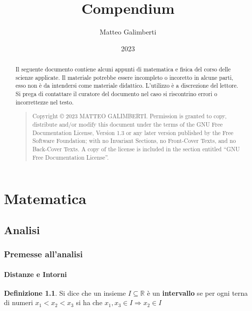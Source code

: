 \documentclass[]{report}
\title{Compendium}
\author{Matteo Galimberti}
\date{2023}
\theoremstyle{definition}
\newtheorem{defin}{Definizione}[chapter]
\theoremstyle{remark}
\theoremstyle{plain}
\numberwithin{equation}{chapter}
\begin{document}

\maketitle

\begin{abstract}
	Il seguente documento contiene alcuni appunti di matematica e fisica del corso delle scienze applicate. Il materiale potrebbe essere incompleto o incoretto in alcune parti, esso non \`{e} da intendersi come materiale didattico. L'utilizzo \`{e} a discrezione del lettore. Si prega di contattare il curatore del documento nel caso si riscontrino errori o incorrettezze nel testo.

\bigskip

\begin{quote}
	Copyright \copyright{}  2023  MATTEO GALIMBERTI.
	Permission is granted to copy, distribute and/or modify this document
	under the terms of the GNU Free Documentation License, Version 1.3
	or any later version published by the Free Software Foundation;
	with no Invariant Sections, no Front-Cover Texts, and no Back-Cover Texts.
	A copy of the license is included in the section entitled ``GNU
	Free Documentation License''.
\end{quote}

\end{abstract}

\tableofcontents

\part{Matematica}

\chapter{Analisi}

\section{Premesse all'analisi}

\subsection{Distanze e Intorni}

\begin{defin}\label{intervallo}
	Si dice che un insieme $I \subseteq \mathbb{R}$ \`{e} un \textbf{intervallo} se per ogni terna di numeri $ x_{1}<x_{2}<x_{3}$ si ha che $x_{1},x_{3} \in I \Rightarrow x_{2} \in I $ 
\end{defin}
\end{document}
